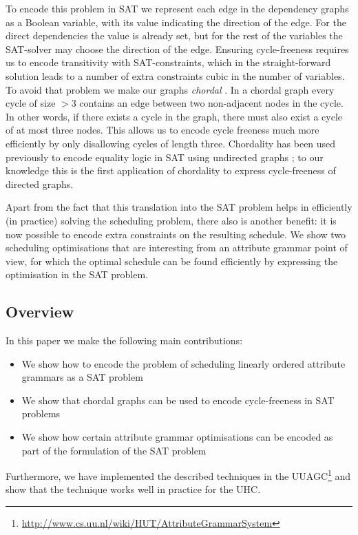 \documentclass{llncs}
\begin{document}
To encode this problem in SAT we represent each edge in the dependency graphs as a Boolean variable, with its value indicating the direction of the edge. For the direct dependencies the value is already set, but for the rest of the variables the SAT-solver may choose the direction of the edge. Ensuring cycle-freeness requires us to encode transitivity with SAT-constraints, which in the straight-forward solution leads to a number of extra constraints cubic in the number of variables. To avoid that problem we make our graphs \emph{chordal} \cite{Dirac:1961}. In a chordal graph every cycle of size $> 3$ contains an edge between two non-adjacent nodes in the cycle. In other words, if there exists a cycle in the graph, there must also exist a cycle of at most three nodes. This allows us to encode cycle freeness much more efficiently by only disallowing cycles of length three. Chordality has been used previously to encode equality logic in SAT using undirected graphs \cite{bryant-chordal}; to our knowledge this is the first application of chordality to express cycle-freeness of directed graphs.

Apart from the fact that this translation into the SAT problem helps in efficiently (in practice) solving the scheduling problem, there also is another benefit: it is now possible to encode extra constraints on the resulting schedule. We show two scheduling optimisations that are interesting from an attribute grammar point of view, for which the optimal schedule can be found efficiently by expressing the optimisation in the SAT problem.

\subsection{Overview}
In this paper we make the following main contributions:
\begin{itemize}
\item We show how to encode the problem of scheduling linearly ordered attribute grammars as a SAT problem
\item We show that chordal graphs can be used to encode cycle-freeness in SAT problems
\item We show how certain attribute grammar optimisations can be encoded as part of the formulation of the SAT problem
\end{itemize}
Furthermore, we have implemented the described techniques in the UUAGC\footnote{\url{http://www.cs.uu.nl/wiki/HUT/AttributeGrammarSystem}} \cite{combinator-languages} and show that the technique works well in practice for the UHC.
\end{document}
